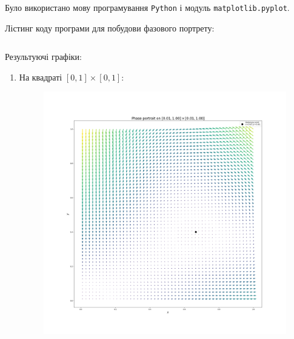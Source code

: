 Було використано мову програмування \texttt{Python} і модуль \texttt{matplotlib.pyplot}. \medskip

Лістинг коду програми для побудови фазового портрету:
\inputminted{python}{py/phase.py}

Результуючі графіки:

\begin{enumerate}
	\item На квадраті $[0, 1] \times [0, 1]$:
	\begin{figure}
		\centering
		\includegraphics[width=\textwidth]{phase_0.01_1.00_0.01_1.00_50.png}
	\end{figure}


\end{enumerate}

